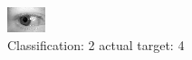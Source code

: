 \begin{figure}[h!]
\begin{center}
\includegraphics[width=0.60\columnwidth]{figures/ID718_class_2_target_4.png}
\end{center}
\caption{ Classification: 2 actual target: 4}
\label{fig:ID718_class_2_target_4}
\end{figure}
